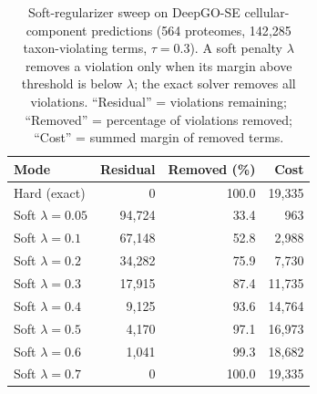 \begin{table}[!h]
\centering
\caption{Soft-regularizer sweep on DeepGO-SE cellular-component predictions (564 proteomes, 142{,}285 taxon-violating terms, $\tau=0.3$). A soft penalty $\lambda$ removes a violation only when its margin above threshold is below $\lambda$; the exact solver removes all violations. ``Residual'' = violations remaining; ``Removed'' = percentage of violations removed; ``Cost'' = summed margin of removed terms.}
\label{tab:supp-soft}
\small
\setlength{\tabcolsep}{6pt}
\renewcommand{\arraystretch}{0.95}
\begin{tabular}{lrrr}
\toprule
Mode & Residual & Removed (\%) & Cost \\
\midrule
Hard (exact)        &      0 & 100.0 & 19{,}335 \\
\addlinespace[2pt]
Soft $\lambda=0.05$ & 94{,}724 &  33.4 &    963 \\
Soft $\lambda=0.1$  & 67{,}148 &  52.8 & 2{,}988 \\
Soft $\lambda=0.2$  & 34{,}282 &  75.9 & 7{,}730 \\
Soft $\lambda=0.3$  & 17{,}915 &  87.4 & 11{,}735 \\
Soft $\lambda=0.4$  &  9{,}125 &  93.6 & 14{,}764 \\
Soft $\lambda=0.5$  &  4{,}170 &  97.1 & 16{,}973 \\
Soft $\lambda=0.6$  &  1{,}041 &  99.3 & 18{,}682 \\
Soft $\lambda=0.7$  &      0 & 100.0 & 19{,}335 \\
\bottomrule
\end{tabular}
\end{table}
